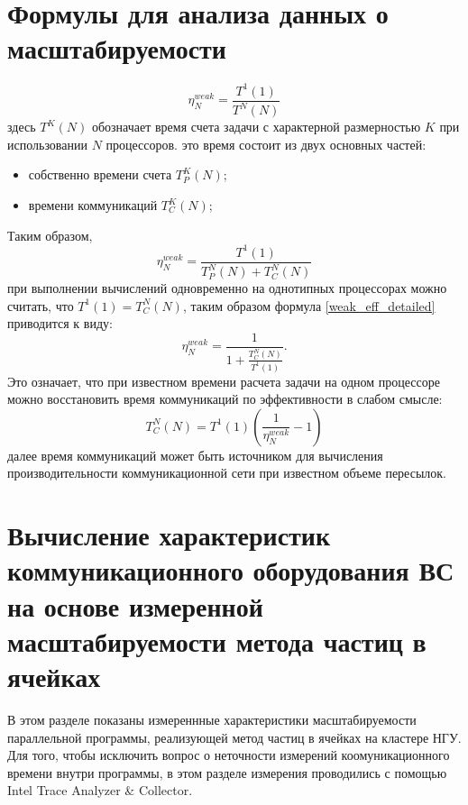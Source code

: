 		\section{Формулы для анализа данных о масштабируемости}
		
			\begin{equation}
			\label{weak_eff}
			\eta^{weak}_N = \frac{T^1(1)}{T^N(N)}
			\end{equation}
			здесь $T^K(N)$ обозначает время счета задачи с характерной размерностью $K$ при использовании $N$ процессоров.
			это время состоит из двух основных частей:
			\begin{itemize}
				\item собственно времени счета $T^K_{P}(N)$;
				\item времени коммуникаций $T^K_C(N)$;
			\end{itemize}
			Таким образом,
			\begin{equation}
			\label{weak_eff_detailed}
			\eta^{weak}_N = \frac{T^1(1)}{T^N_{P}(N)+T^N_C(N)}
			\end{equation}
			при выполнении вычислений одновременно на однотипных процессорах
			можно считать, что $T^1(1) = T^N_C(N)$, таким образом формула
			\ref{weak_eff_detailed} приводится к виду:
			\begin{equation}
			\label{weak_eff_detailed-time}
			\eta^{weak}_N = \frac{1}{1+ \frac{T^N_{C}(N)}{T^1(1)}}.
			\end{equation}
			Это означает, что при известном времени расчета задачи на одном процессоре можно восстановить время коммуникаций по эффективности в слабом смысле:
			\begin{equation}
			\label{comm_time_from_efficiency}
			T^N_{C}(N) = T^1(1) \left(\frac{1}{\eta^{weak}_N} - 1\right)
			\end{equation}
			далее время коммуникаций может быть источником для вычисления производительности коммуникационной сети при известном объеме пересылок.
			
			
			
		
		
		
	
	    \section{Вычисление характеристик коммуникационного оборудования ВС на основе измеренной масштабируемости метода частиц в ячейках}
	    
	    
	    
	    В этом разделе показаны измереннные характеристики масштабируемости параллельной программы, реализующей метод частиц в ячейках на кластере НГУ. Для того, чтобы исключить вопрос о неточности измерений коомуникационного времени внутри программы, в этом разделе измерения проводились с помощью Intel Trace Analyzer \& Collector.
	    
